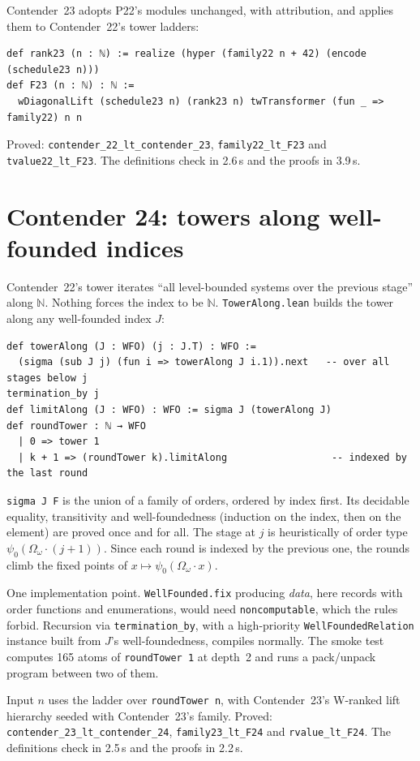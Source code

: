\documentclass[11pt]{article}
\theoremstyle{definition}
\theoremstyle{remark}
\newcommand{\lean}[1]{\texttt{#1}}
\begin{document}
Contender~23 adopts P22's modules unchanged, with attribution, and applies
them to Contender~22's tower ladders:
\begin{lstlisting}
def rank23 (n : ℕ) := realize (hyper (family22 n + 42) (encode (schedule23 n)))
def F23 (n : ℕ) : ℕ :=
  wDiagonalLift (schedule23 n) (rank23 n) twTransformer (fun _ => family22) n n
\end{lstlisting}
Proved: \lean{contender\_22\_lt\_\allowbreak contender\_23},
\lean{family22\_lt\_F23} and \lean{tvalue22\_lt\_F23}. The definitions check in
2.6\,s and the proofs in 3.9\,s.

\section{Contender 24: towers along well-founded indices}

Contender~22's tower iterates ``all level-bounded systems over the previous
stage'' along $\mathbb N$. Nothing forces the index to be $\mathbb N$.
\lean{TowerAlong.lean} builds the tower along any well-founded index $J$:
\begin{lstlisting}
def towerAlong (J : WFO) (j : J.T) : WFO :=
  (sigma (sub J j) (fun i => towerAlong J i.1)).next   -- over all stages below j
termination_by j
def limitAlong (J : WFO) : WFO := sigma J (towerAlong J)
def roundTower : ℕ → WFO
  | 0 => tower 1
  | k + 1 => (roundTower k).limitAlong                  -- indexed by the last round
\end{lstlisting}
\lean{sigma J F} is the union of a family of orders, ordered by index first.
Its decidable equality, transitivity and well-foundedness (induction on the
index, then on the element) are proved once and for all. The stage at $j$ is
heuristically of order type $\psi_0(\Omega_\omega\cdot(j+1))$. Since each
round is indexed by the previous one, the rounds climb the fixed points of
$x\mapsto\psi_0(\Omega_\omega\cdot x)$.

One implementation point. \lean{WellFounded.fix} producing \emph{data}, here
records with order functions and enumerations, would need
\lean{noncomputable}, which the rules forbid. Recursion via
\lean{termination\_by}, with a high-priority \lean{WellFoundedRelation}
instance built from $J$'s well-foundedness, compiles normally. The smoke test
computes 165 atoms of \lean{roundTower 1} at depth~2 and runs a pack/unpack
program between two of them.

Input $n$ uses the ladder over \lean{roundTower n}, with Contender~23's W-ranked
lift hierarchy seeded with Contender~23's family. Proved:
\lean{contender\_23\_lt\_\allowbreak contender\_24}, \lean{family23\_lt\_F24} and
\lean{rvalue\_lt\_F24}. The definitions check in 2.5\,s and the proofs in 2.2\,s.
\end{document}
